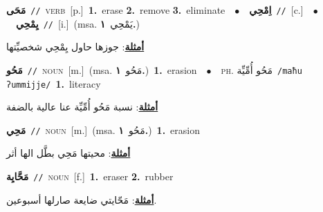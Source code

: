 \documentclass[10pt,a4paper,twoside]{article} %
\begin{document}
\begin{multicols}{2}
{\setlength\topsep{0pt}\textbf{\foreignlanguage{arabic}{مَحَى}}\ {\color{gray}\texttt{//}\color{black}}\ \textsc{verb}\ [p.]\ \textbf{1.}~erase  \textbf{2.}~remove  \textbf{3.}~eliminate\ \ $\bullet$\ \ \setlength\topsep{0pt}\textbf{\foreignlanguage{arabic}{اِمْحِي}}\ {\color{gray}\texttt{//}\color{black}}\ [c.]\ \ $\bullet$\ \ \setlength\topsep{0pt}\textbf{\foreignlanguage{arabic}{يِمْحِي}}\ {\color{gray}\texttt{//}\color{black}}\ [i.]\ \color{gray}(msa. \foreignlanguage{arabic}{يَمْحِي}~\foreignlanguage{arabic}{\textbf{١.}})\color{black}\  \begin{flushright}\color{gray}\foreignlanguage{arabic}{\textbf{\underline{\foreignlanguage{arabic}{أمثلة}}}: جوزها حاول يِمْحِي شخصيِّتها}\end{flushright}\color{black}} \vspace{2mm}

{\setlength\topsep{0pt}\textbf{\foreignlanguage{arabic}{مَحُو}}\ {\color{gray}\texttt{//}\color{black}}\ \textsc{noun}\ [m.]\ \color{gray}(msa. \foreignlanguage{arabic}{مَحُو}~\foreignlanguage{arabic}{\textbf{١.}})\color{black}\ \textbf{1.}~erasion\ \ $\bullet$\ \ \textsc{ph.} \color{gray} \foreignlanguage{arabic}{مَحُو أُمِّيِّة}\color{black}\ {\color{gray}\texttt{/{\sffamily maħu ʔummijje}/}\color{black}}\ \textbf{1.}~literacy\  \begin{flushright}\color{gray}\foreignlanguage{arabic}{\textbf{\underline{\foreignlanguage{arabic}{أمثلة}}}: نسبة مَحُو أُمِّيِّة عنا عالية بالضفة}\end{flushright}\color{black}} \vspace{2mm}

{\setlength\topsep{0pt}\textbf{\foreignlanguage{arabic}{مَحِي}}\ {\color{gray}\texttt{//}\color{black}}\ \textsc{noun}\ [m.]\ \color{gray}(msa. \foreignlanguage{arabic}{مَحُو}~\foreignlanguage{arabic}{\textbf{١.}})\color{black}\ \textbf{1.}~erasion\  \begin{flushright}\color{gray}\foreignlanguage{arabic}{\textbf{\underline{\foreignlanguage{arabic}{أمثلة}}}: محيتها مَحِي بطَّل الها أثر}\end{flushright}\color{black}} \vspace{2mm}

{\setlength\topsep{0pt}\textbf{\foreignlanguage{arabic}{مَحَّايِة}}\ {\color{gray}\texttt{//}\color{black}}\ \textsc{noun}\ [f.]\ \textbf{1.}~eraser  \textbf{2.}~rubber\  \begin{flushright}\color{gray}\foreignlanguage{arabic}{\textbf{\underline{\foreignlanguage{arabic}{أمثلة}}}: مَحّايتي ضايعة صارلها أسبوعين.}\end{flushright}\color{black}} \vspace{2mm}


\end{multicols}
\end{document}
